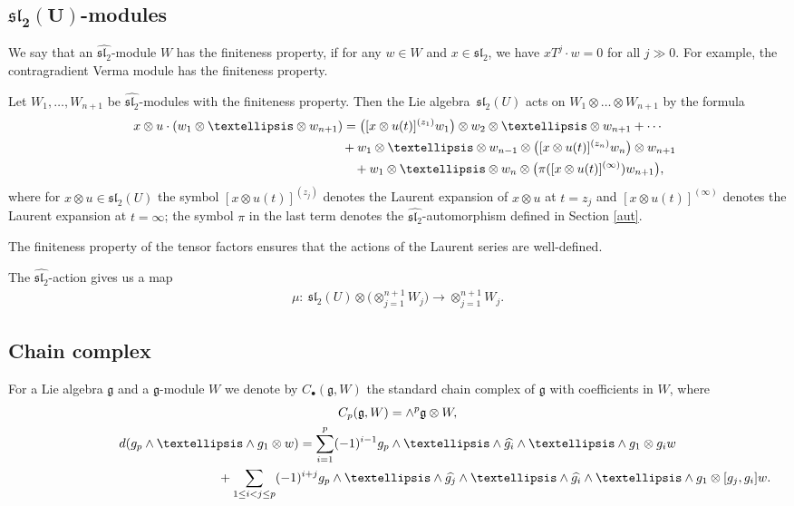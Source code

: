 \documentclass[11pt]{article}
\numberwithin{equation}{section}
\begin{document}
\subsection[$\mathfrak{sl}_2(U)$-modules]{$\boldsymbol{\mathfrak{sl}_2(U)}$-modules}
We say that an $\widehat{{\mathfrak{sl}_2}}$-module $W$ has the finiteness property, if for any $w\in W$ and $ x\in\mathfrak{sl}_2$, we have $xT^j \cdot w=0$ for all $j \gg 0$. For example, the contragradient Verma module has the finiteness property.

Let $W_1,\dots,W_{n+1}$ be $\widehat{{\mathfrak{sl}_2}}$-modules with the finiteness property. Then the Lie algebra~$\mathfrak{sl}_2(U)$ acts on $W_1\otimes\dots\otimes W_{n+1}$ by the formula
\begin{gather*}
x\otimes u \cdot (w_1\otimes\dots\otimes w_{n+1}) = \big([x\otimes u(t)]^{(z_1)} w_1\big)
\otimes w_2\otimes\dots\otimes w_{n+1}+ \cdots \nonumber\\
\hphantom{x\otimes u \cdot (w_1\otimes\dots\otimes w_{n+1}) =}{} + w_1\otimes\dots\otimes w_{n-1}\otimes \big([x\otimes u(t)]^{(z_n)} w_n\big)\otimes w_{n+1} \nonumber\\
\hphantom{x\otimes u \cdot (w_1\otimes\dots\otimes w_{n+1}) =}{} + w_1\otimes\dots\otimes w_n\otimes \big(\pi([x\otimes u(t)]^{(\infty)}) w_{n+1}\big), %
\end{gather*}
where for $x\otimes u \in\mathfrak{sl}_2(U)$ the symbol $[x\otimes u(t)]^{(z_j)}$ denotes the Laurent expansion of $x\otimes u$ at $t=z_j$ and $[x\otimes u(t)]^{(\infty)}$ denotes the Laurent expansion at $t=\infty$; the symbol $\pi$ in the last term denotes the $\widehat{{\mathfrak{sl}_2}}$-automorphism defined in Section \ref{aut}.

The finiteness property of the tensor factors ensures that the actions of the Laurent series are well-defined.

The $\widehat{{\mathfrak{sl}_2}}$-action gives us a map
\begin{gather}\label{mult}
\mu\colon \ \mathfrak{sl}_2(U)\otimes \big(\otimes_{j=1}^{n+1} W_j\big) \to \otimes_{j=1}^{n+1} W_j .
\end{gather}

\subsection{Chain complex}
For a Lie algebra ${\mathfrak g}$ and a ${\mathfrak g}$-module $W$ we denote by $C_{\bullet}({\mathfrak g}, W)$ the standard chain complex of ${\mathfrak g}$ with coefficients in $W$, where
\begin{gather*}
 C_p({\mathfrak g}, W) = \wedge ^p{\mathfrak g} \otimes W, \\
{\rm d}(g_p\wedge \dots\wedge g_1\otimes w) = \sum_{i=1}^p(-1)^{i-1} g_p\wedge \dots\wedge \widehat{g_i}\wedge\dots \wedge g_1\otimes g_iw \\
\hphantom{{\rm d}(g_p\wedge \dots\wedge g_1\otimes w) =}{} + \sum_{1\leq i<j\leq p}(-1)^{i+j} g_p\wedge \dots\wedge \widehat{g_j}\wedge\dots\wedge \widehat{g_i}\wedge\dots \wedge g_1\otimes [g_j,g_i]w.
\end{gather*}
\end{document}
